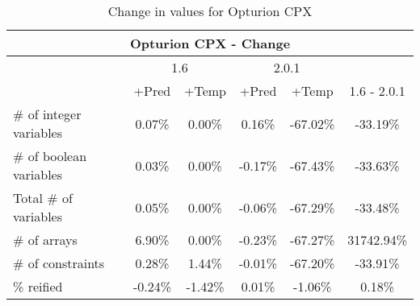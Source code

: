 \documentclass{standalone}
\begin{document}
\begin{table}[H]
\footnotesize
\centering
\begin{tabular}{lc|c|c|c|c}
\multicolumn{6}{c}{Opturion CPX - Change} \\ 
\hline\hline  & \multicolumn{2}{c|}{1.6} &\multicolumn{2}{c|}{2.0.1} &\\ 
\hline  & +Pred & +Temp & +Pred & +Temp & 1.6 - 2.0.1\\
\# of integer variables & 0.07\% & 0.00\% & 0.16\% & -67.02\% & -33.19\% \\ 
\# of boolean variables & 0.03\% & 0.00\% & -0.17\% & -67.43\% & -33.63\% \\ 
Total \# of variables & 0.05\% & 0.00\% & -0.06\% & -67.29\% & -33.48\% \\ 
\# of arrays            & 6.90\% & 0.00\% & -0.23\% & -67.27\% & 31742.94\% \\
\# of constraints       & 0.28\% & 1.44\% & -0.01\% & -67.20\% & -33.91\% \\ 
\% reified               & -0.24\% & -1.42\% & 0.01\% & -1.06\% & 0.18\%\\ 
\end{tabular}\caption{Change in values for Opturion CPX}
\end{table}
\end{document}
